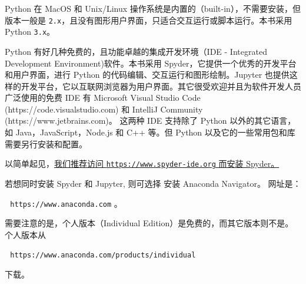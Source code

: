 \documentclass[main.tex]{subfiles}
\begin{document}
Python 在 MacOS 和 Unix/Linux 操作系统是内置的（built-in），不需要安装，但版本一般是 \texttt{2.x}，且没有图形用户界面，只适合交互运行或脚本运行。本书采用 Python \texttt{3.x}。

Python 有好几种免费的，且功能卓越的集成开发环境（IDE - Integrated Development Environment)软件。本书采用 Spyder，它提供一个优秀的开发平台和用户界面，进行 Python 的代码编辑、交互运行和图形绘制。Jupyter 也提供这样的开发平台，它以互联网浏览器为用户界面。其它很受欢迎并且为软件开发人员广泛使用的免费 IDE 有 Microsoft Visual Studio Code (https://code.visualstudio.com) 和 IntelliJ Community (https://www.jetbrains.com)。
这两种 IDE 支持除了 Python 以外的其它语言，如 Java，JavaScript，Node.js 和 C++ 等。但 Python 以及它的一些常用包和库需要另行安装和配置。  


以简单起见，\underline{我们推荐访问
\texttt{https://www.spyder-ide.org} 而安装 Spyder。
}

若想同时安装 Spyder 和 Jupyter, 则可选择 
安装 Anaconda Navigator。 网址是：

\,\,\,\,\texttt{https://www.anaconda.com} 。

\noindent 需要注意的是，个人版本（Individual Edition）是免费的，而其它版本则不是。个人版本从

\,\,\,\,\texttt{https://www.anaconda.com/products/individual} 

\noindent 下载。
\end{document}
